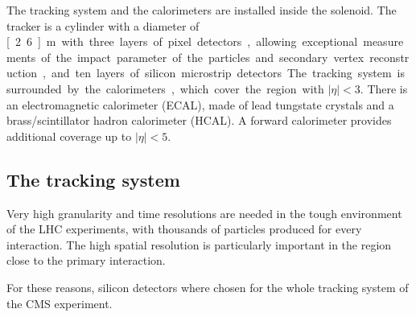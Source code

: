 The tracking system and the calorimeters are installed inside the solenoid.
The tracker is a cylinder with a diameter of \unit[2.6]{m} with three layers
of pixel detectors, allowing exceptional measurements of the impact parameter
of the particles and secondary vertex reconstruction, and ten layers of
silicon microstrip detectors.
The tracking system is surrounded by the calorimeters, which cover the
region with $|\eta| < 3$. There is an electromagnetic calorimeter (ECAL),
made of lead tungstate crystals and a brass/scintillator hadron calorimeter
(HCAL). A forward calorimeter provides additional coverage up to $|\eta| <
5$.

\subsection{The tracking system}
Very high granularity and time resolutions are needed in the tough
environment of the LHC experiments, with thousands of particles produced
for every interaction. The high spatial resolution is particularly important
in the region close to the primary interaction.

For these reasons, silicon detectors where chosen for the whole tracking
system of the CMS experiment.

